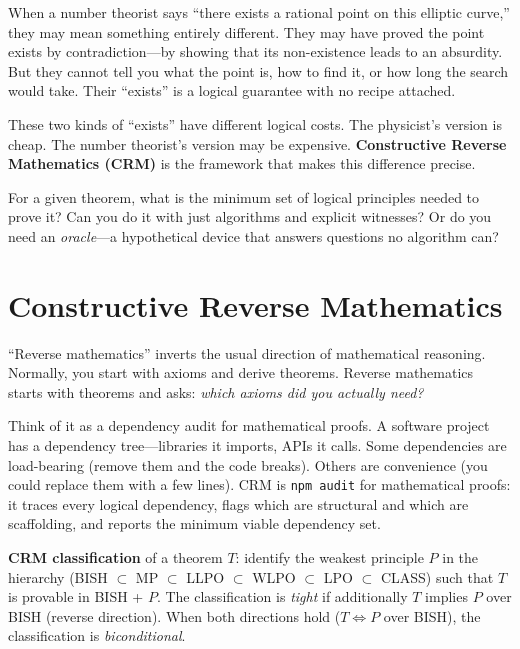 \documentclass[11pt,twoside,openany]{report}
\theoremstyle{remark}
\newcommand{\BISH}{\textsf{BISH}}
\newcommand{\WLPO}{\textsf{WLPO}}
\newcommand{\LLPO}{\textsf{LLPO}}
\newcommand{\LPO}{\textsf{LPO}}
\newcommand{\CLASS}{\textsf{CLASS}}
\newcommand{\MP}{\textsf{MP}}
\begin{document}
When a number theorist says ``there exists a rational point on this elliptic curve,'' they may mean something entirely different. They may have proved the point exists by contradiction---by showing that its non-existence leads to an absurdity. But they cannot tell you what the point is, how to find it, or how long the search would take. Their ``exists'' is a logical guarantee with no recipe attached.

These two kinds of ``exists'' have different logical costs. The physicist's version is cheap. The number theorist's version may be expensive. \textbf{Constructive Reverse Mathematics (CRM)} is the framework that makes this difference precise.

\begin{thesisbox}
For a given theorem, what is the minimum set of logical principles needed to prove it?
Can you do it with just algorithms and explicit witnesses?
Or do you need an \emph{oracle}---a hypothetical device that answers questions no algorithm can?
\end{thesisbox}


\section{Constructive Reverse Mathematics}

``Reverse mathematics'' inverts the usual direction of mathematical reasoning. Normally, you start with axioms and derive theorems. Reverse mathematics starts with theorems and asks: \emph{which axioms did you actually need?}

Think of it as a dependency audit for mathematical proofs. A software project has a dependency tree---libraries it imports, APIs it calls. Some dependencies are load-bearing (remove them and the code breaks). Others are convenience (you could replace them with a few lines). CRM is \texttt{npm audit} for mathematical proofs: it traces every logical dependency, flags which are structural and which are scaffolding, and reports the minimum viable dependency set.

\begin{thesisbox}
\textbf{CRM classification} of a theorem $T$: identify the weakest principle $P$ in the hierarchy (\BISH{} $\subset$ \MP{} $\subset$ \LLPO{} $\subset$ \WLPO{} $\subset$ \LPO{} $\subset$ \CLASS) such that $T$ is provable in \BISH{} + $P$. The classification is \emph{tight} if additionally $T$ implies $P$ over \BISH{} (reverse direction). When both directions hold ($T \Leftrightarrow P$ over \BISH), the classification is \emph{biconditional}.
\end{thesisbox}
\end{document}
